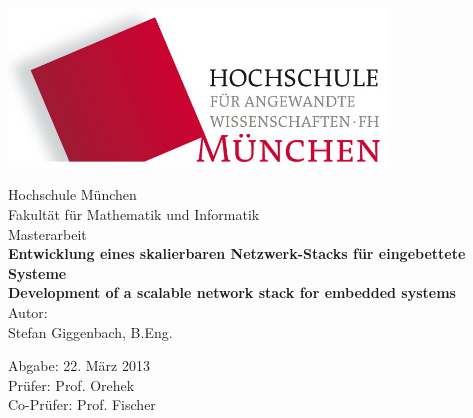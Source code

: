 \thispagestyle{empty}
\begin{flushright}
\includegraphics[width=0.75\textwidth]{img/hm.jpg}%
\end{flushright}

\vspace*{20mm}
\begin{center}
  {\Large Hochschule München}\\
  {\large Fakultät für Mathematik und Informatik}\\

  \vspace*{15mm}
  {\huge Masterarbeit}\\

  \vspace*{10mm}
  {\huge \bfseries{Entwicklung eines skalierbaren Netzwerk-Stacks für eingebettete Systeme}}\\
  \vspace*{10mm}
  {\huge \bfseries{Development of a scalable network stack for embedded systems}}\\

  \vspace*{15mm}
  {\Large Autor:\\
  Stefan Giggenbach, B.Eng.}\\
\end{center}

\vfill
{\large
Abgabe: 22. März 2013\\
Prüfer: Prof. Orehek\\
Co-Prüfer: Prof. Fischer}

\clearpage
